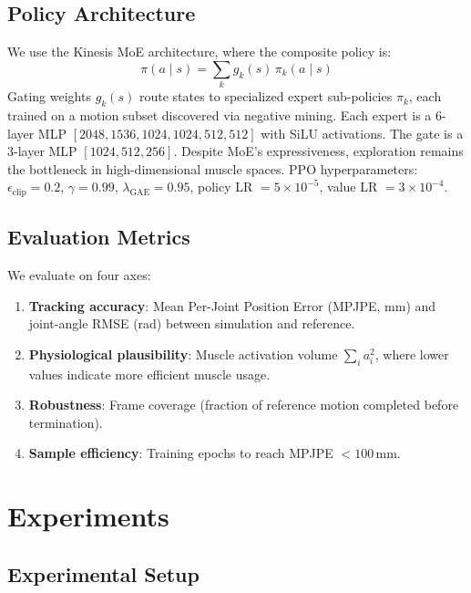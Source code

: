 \documentclass[10pt,twocolumn]{article}
\begin{document}
\subsection{Policy Architecture}

We use the Kinesis MoE architecture, where the composite policy is:
\begin{equation}
\pi(a \mid s) = \textstyle\sum_k g_k(s)\,\pi_k(a \mid s)
\end{equation}
Gating weights $g_k(s)$ route states to specialized expert sub-policies $\pi_k$, each trained on a motion subset discovered via negative mining. Each expert is a 6-layer MLP $[2048, 1536, 1024, 1024, 512, 512]$ with SiLU activations. The gate is a 3-layer MLP $[1024, 512, 256]$. Despite MoE's expressiveness, exploration remains the bottleneck in high-dimensional muscle spaces. PPO hyperparameters: $\epsilon_\text{clip}=0.2$, $\gamma=0.99$, $\lambda_\text{GAE}=0.95$, policy LR $= 5 \times 10^{-5}$, value LR $= 3 \times 10^{-4}$.

\subsection{Evaluation Metrics}

We evaluate on four axes:
\begin{enumerate}[nosep, leftmargin=*]
\item \textbf{Tracking accuracy}: Mean Per-Joint Position Error (MPJPE, mm) and joint-angle RMSE (rad) between simulation and reference.
\item \textbf{Physiological plausibility}: Muscle activation volume $\sum_i a_i^2$, where lower values indicate more efficient muscle usage.
\item \textbf{Robustness}: Frame coverage (fraction of reference motion completed before termination).
\item \textbf{Sample efficiency}: Training epochs to reach MPJPE $< 100$\,mm.
\end{enumerate}

\section{Experiments}
\label{sec:experiments}

\subsection{Experimental Setup}
\end{document}

